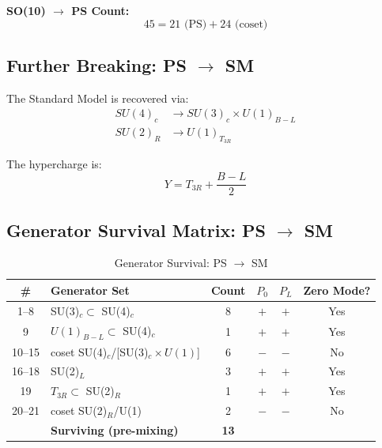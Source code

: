 \documentclass[11pt,a4paper]{article}
\begin{document}
\begin{resultbox}
\textbf{SO(10) $\to$ PS Count:}
\begin{equation}
  45 = 21 \text{ (PS)} + 24 \text{ (coset)}
  \label{eq:so10-ps-count}
\end{equation}
\end{resultbox}

\subsection{Further Breaking: PS $\to$ SM}

The Standard Model is recovered via:
\begin{align}
  SU(4)_c &\to SU(3)_c \times U(1)_{B-L}
  \label{eq:su4-breaking} \\
  SU(2)_R &\to U(1)_{T_{3R}}
  \label{eq:su2r-breaking}
\end{align}

The hypercharge is:
\begin{equation}
  \boxed{Y = T_{3R} + \frac{B-L}{2}}
  \label{eq:hypercharge-formula}
\end{equation}

\subsection{Generator Survival Matrix: PS $\to$ SM}

\begin{table}[ht]
\centering
\caption{Generator Survival: PS $\to$ SM}
\label{tab:ps-sm-survival}
\small
\begin{tabular}{clcccc}
\toprule
\# & Generator Set & Count & $P_0$ & $P_L$ & Zero Mode? \\
\midrule
1--8 & SU(3)$_c \subset$ SU(4)$_c$ & 8 & $+$ & $+$ & Yes \\
9 & $U(1)_{B-L} \subset$ SU(4)$_c$ & 1 & $+$ & $+$ & Yes \\
10--15 & coset SU(4)$_c$/[SU(3)$_c \times U(1)$] & 6 & $-$ & $-$ & No \\
16--18 & SU(2)$_L$ & 3 & $+$ & $+$ & Yes \\
19 & $T_{3R} \subset$ SU(2)$_R$ & 1 & $+$ & $+$ & Yes \\
20--21 & coset SU(2)$_R$/U(1) & 2 & $-$ & $-$ & No \\
\midrule
& \textbf{Surviving (pre-mixing)} & \textbf{13} & & & \\
\bottomrule
\end{tabular}
\end{table}
\end{document}
